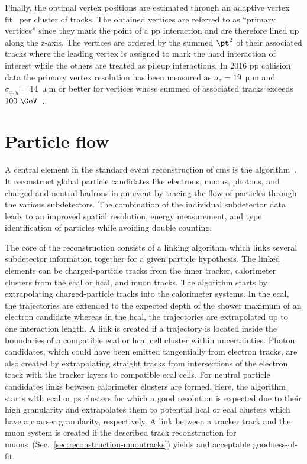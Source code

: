 Finally, the optimal vertex positions are estimated through an adaptive vertex fit~\cite{0954-3899-34-12-N01} per cluster of tracks. The obtained vertices are referred to as ``primary vertices'' since they mark the point of a pp interaction and are therefore lined up along the z-axis. The vertices are ordered by the summed $\pt^2$ of their associated tracks where the leading vertex is assigned to mark the hard interaction of interest while the others are treated as pileup interactions. In 2016 pp collision data the primary vertex resolution has been measured as $\sigma_{z}=19~\upmu\mathrm{m}$ and $\sigma_{x,y}=14~\upmu\mathrm{m}$ or better for vertices whose summed \pt of associated tracks exceeds $100~\GeV$~\cite{CMS-DP-2016-041}.



\section{Particle flow}

A central element in the standard event reconstruction of \gls{cms} is the  algorithm~\cite{CMS:2009nxa}. It reconstruct global particle candidates like electrons, muons, photons, and charged and neutral hadrons in an event by tracing the flow of particles through the various subdetectors. The combination of the individual subdetector data leads to an improved spatial resolution, energy measurement, and type identification of particles while avoiding double counting.

The core of the  reconstruction consists of a linking algorithm which links several subdetector information together for a given particle hypothesis. The linked elements can be charged-particle tracks from the inner tracker, calorimeter clusters from the \gls{ecal} or \gls{hcal}, and muon tracks. The algorithm starts by extrapolating charged-particle tracks into the calorimeter systems. In the \gls{ecal}, the trajectories are extended to the expected depth of the shower maximum of an electron candidate whereas in the \gls{hcal}, the trajectories are extrapolated up to one interaction length. A link is created if a trajectory is located inside the boundaries of a compatible \gls{ecal} or \gls{hcal} cell cluster within uncertainties. Photon candidates, which could have been emitted tangentially from electron tracks, are also created by extrapolating straight tracks from intersections of the electron track with the tracker layers to compatible \gls{ecal} cells. For neutral particle candidates links between calorimeter clusters are formed. Here, the algorithm starts with \gls{ecal} or \gls{ps} clusters for which a good resolution is expected due to their high granularity and extrapolates them to potential \gls{hcal} or \gls{ecal} clusters which have a coarser granularity, respectively. A link between a tracker track and the muon system is created if the described track reconstruction for muons~(Sec.~\ref{sec:reconstruction-muontracks}) yields and acceptable goodness-of-fit.


